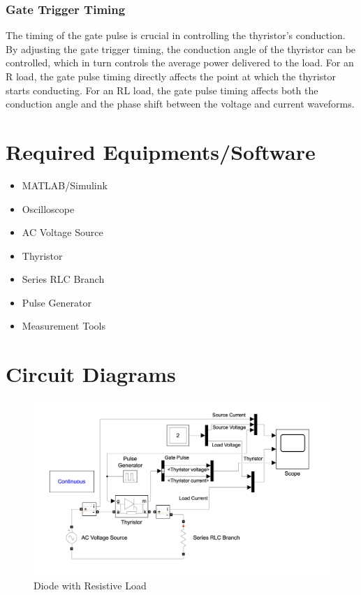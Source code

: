 \documentclass[12pt]{article}
\begin{document}
\subsubsection*{Gate Trigger Timing}
The timing of the gate pulse is crucial in controlling the thyristor's conduction. By adjusting the gate trigger timing, the conduction angle of the thyristor can be controlled, which in turn controls the average power delivered to the load. For an R load, the gate pulse timing directly affects the point at which the thyristor starts conducting. For an RL load, the gate pulse timing affects both the conduction angle and the phase shift between the voltage and current waveforms.

\section*{Required Equipments/Software}
\begin{itemize}
    \item MATLAB/Simulink
    \item Oscilloscope
    \item AC Voltage Source
    \item Thyristor
    \item Series RLC Branch
    \item Pulse Generator
    \item Measurement Tools
\end{itemize}

\section*{Circuit Diagrams}
\begin{figure}[H]
    \centering
    \includegraphics[width=\textwidth]{ckt.png}
    \caption{Diode with Resistive Load}
    \label{fig:dc_r_load}
\end{figure}
\end{document}
